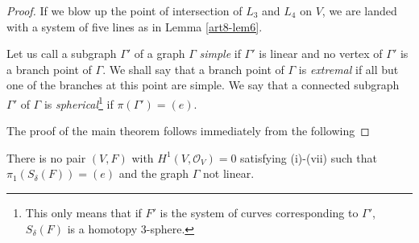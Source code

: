 \begin{proof}
If we blow up the point of intersection of $L_3$ and $L_4$ on $V$, we are landed with a system of five lines as in Lemma \ref{art8-lem6}.

Let us call a subgraph $\Gamma'$ of a graph $\Gamma$ {\em simple} if $\Gamma'$ is linear and no vertex of $\Gamma'$ is a branch point of $\Gamma$. We shall say that a branch point of $\Gamma$ is {\em extremal} if all but one of the branches at this point are simple. We say that a connected subgraph $\Gamma'$ of $\Gamma$ is {\em spherical}\footnote{This only means that if $F'$ is the system of curves corresponding to $\Gamma'$, $S_\delta (F)$ is a homotopy 3-sphere.} if $\pi (\Gamma') = (e)$.

The proof of the main theorem follows immediately from the following 
\end{proof}

\begin{prop*}
There is no pair $(V,F)$ with $H^1 (V, \mathscr{O}_V) =0$ satisfying (i)-(vii) such that $\pi_1 (S_\delta (F)) = (e)$ and the graph $\Gamma$ not linear.
\end{prop*}

